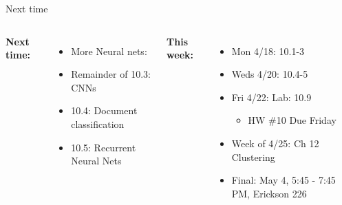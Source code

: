 \documentclass[aspectratio=169,usenames,dvipsnames]{beamer}
\begin{document}
\begin{frame}[t]{Next time}


\begin{columns}
\centering

\textbf{Next time:}

\begin{itemize}
	\item More Neural nets:
	\item Remainder of 10.3: CNNs
	\item 10.4: Document classification
	\item 10.5: Recurrent Neural Nets
\end{itemize}

\centering

\textbf{This week:}

	\begin{itemize}
	\item Mon 4/18: 10.1-3
	\item Weds 4/20: 10.4-5
	\item Fri 4/22: Lab: 10.9
	\begin{itemize}
		\item HW \#10 Due Friday
	\end{itemize}
	\item Week of 4/25: Ch 12 Clustering
	\item Final: May 4, 5:45 - 7:45 PM, Erickson 226

	\end{itemize}
	\end{columns}

\end{frame}
\end{document}
